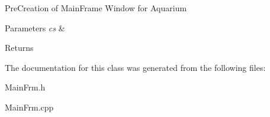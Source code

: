 Pre\+Creation of Main\+Frame Window for Aquarium 
\begin{DoxyParams}{Parameters}
{\em cs} & \\
\hline
\end{DoxyParams}
\begin{DoxyReturn}{Returns}

\end{DoxyReturn}


The documentation for this class was generated from the following files\+:\begin{DoxyCompactItemize}
\item 
Main\+Frm.\+h\item 
Main\+Frm.\+cpp\end{DoxyCompactItemize}
